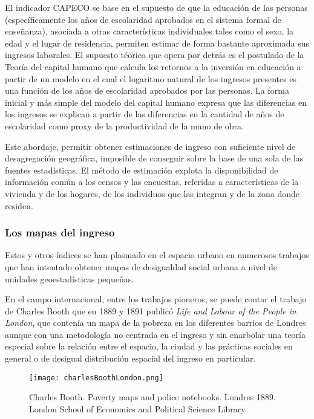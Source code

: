 El indicador CAPECO se base en el supuesto de que la educación de las personas (específicamente los años de escolaridad aprobados en el sistema formal de enseñanza), asociada a otras características individuales tales como el sexo, la edad y el lugar de residencia, permiten estimar de forma bastante aproximada sus ingresos laborales. El supuesto téorico que opera por detrás es el postulado de la Teoría del capital humano \cite{mincer,beckar,schultz1961,schultz1962} que calcula los retornos a la inversión en educación a partir de un modelo en el cual el logaritmo natural de los ingresos presentes es una función de los años de escolaridad aprobados por las personas. La forma inicial y más simple del modelo del capital humano expresa que las diferencias en los ingresos se explican a partir de las diferencias en la cantidad de años de escolaridad como proxy de la productividad de la mano de obra.

Este abordaje, permitir obtener estimaciones de ingreso con suficiente nivel de desagregación geográfica, imposible de conseguir sobre la base de una sola de las fuentes estadísticas. El método de estimación explota la disponibilidad de información común a los censos y las encuestas, referidas a características de la vivienda y de los hogares, de los individuos que las integran y de la zona donde residen.

\subsubsection{Los mapas del ingreso}

Estos y otros índices se han plasmado en el espacio urbano en numerosos trabajos que han intentado obtener mapas de desigualdad social urbana a nivel de unidades geoestadísticas pequeñas.

En el campo internacional, entre los trabajos pioneros, se puede contar el trabajo de Charles Booth que en 1889 y 1891 publicó \textit{Life and Labour of the People in London}, que contenía un mapa de la pobreza en los diferentes barrios de Londres aunque con una metodología no centrada en el ingreso y sin enarbolar una teoría especial sobre la relación entre el espacio, la ciudad y las prácticas sociales en general o de desigual distribución espacial del ingreso en particular. 

\begin{figure}[t]
	\begin{center}
		\texttt{[image: charlesBoothLondon.png]}
		\caption{Charles Booth. Poverty maps and police notebooks. Londres 1889. London School of Economics and Political Science Library}
	\end{center}
\end{figure}


